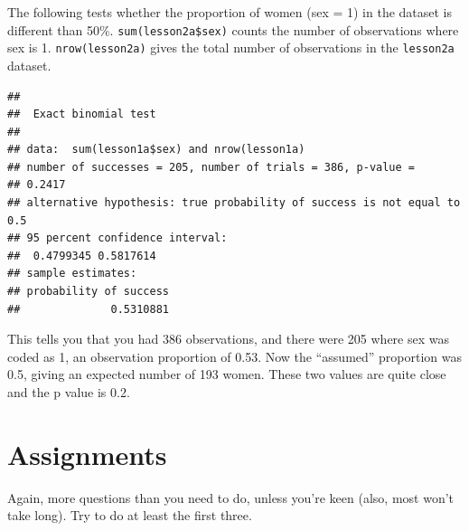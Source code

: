 \documentclass[]{book}
\newenvironment{Shaded}{\begin{snugshade}}{\end{snugshade}}
\newcommand{\DataTypeTok}[1]{\textcolor[rgb]{0.13,0.29,0.53}{#1}}
\newcommand{\FloatTok}[1]{\textcolor[rgb]{0.00,0.00,0.81}{#1}}
\newcommand{\KeywordTok}[1]{\textcolor[rgb]{0.13,0.29,0.53}{\textbf{#1}}}
\newcommand{\NormalTok}[1]{#1}
\newcommand{\OperatorTok}[1]{\textcolor[rgb]{0.81,0.36,0.00}{\textbf{#1}}}
\begin{document}
The following tests whether the proportion of women (sex = 1) in the dataset is different than 50\%. \texttt{sum(lesson2a\$sex)} counts the number of observations where sex is 1. \texttt{nrow(lesson2a)} gives the total number of observations in the \texttt{lesson2a} dataset.

\begin{Shaded}
\end{Shaded}

\begin{verbatim}
## 
##  Exact binomial test
## 
## data:  sum(lesson1a$sex) and nrow(lesson1a)
## number of successes = 205, number of trials = 386, p-value =
## 0.2417
## alternative hypothesis: true probability of success is not equal to 0.5
## 95 percent confidence interval:
##  0.4799345 0.5817614
## sample estimates:
## probability of success 
##              0.5310881
\end{verbatim}

This tells you that you had 386 observations, and there were 205 where sex was coded as 1, an observation proportion of 0.53. Now the ``assumed'' proportion was 0.5, giving an expected number of 193 women. These two values are quite close and the p value is 0.2.

\hypertarget{assignments-2}{%
\section{Assignments}\label{assignments-2}}

Again, more questions than you need to do, unless you're keen (also, most won't take long). Try to do at least the first three.
\end{document}
